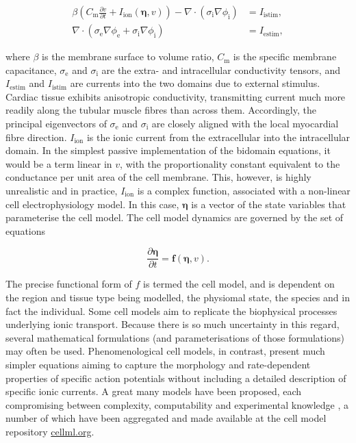   \begin{align}
    \beta \left( C_\text{m}\frac{\partial v}{\partial t} + I_\text{ion}\left( \boldsymbol\eta, v \right) \right) - \nabla \cdot \left( \sigma_\text{i} \nabla \phi_\text{i} \right) &= I_\text{istim}, \\
      \nabla \cdot \left( \sigma_\text{e} \nabla \phi_\text{e} +  \sigma_\text{i} \nabla \phi_\text{i} \right) &= I_\text{estim},
  \end{align} 
  
  where $\beta$ is the membrane surface to volume ratio, $C_\text{m}$ is the specific membrane capacitance, $\sigma_\text{e}$ and $\sigma_\text{i}$ are the extra- and intracellular conductivity tensors, and $I_\text{estim}$ and $I_\text{istim}$ are currents into the two domains due to external stimulus. Cardiac tissue exhibits anisotropic conductivity, transmitting current much more readily along the tubular muscle fibres than across them. Accordingly, the principal eigenvectors of $\sigma_\text{e}$ and $\sigma_\text{i}$ are closely aligned with the local myocardial fibre direction. $I_\text{ion}$ is the ionic current from the extracellular into the intracellular domain. In the simplest passive implementation of the bidomain equations, it would be a term linear in $v$, with the proportionality constant equivalent to the conductance per unit area of the cell membrane. This, however, is highly unrealistic and in practice, $I_\text{ion}$ is a complex function, associated with a non-linear cell electrophysiology model. In this case, $\boldsymbol\eta$ is a vector of the state variables that parameterise the cell model. The cell model dynamics are governed by the set of equations
  
  \begin{equation}
    \frac{\partial \boldsymbol\eta}{\partial t} = \mathbf{f}\left(\boldsymbol\eta, v \right).
  \end{equation}
  
  The precise functional form of $f$ is termed the cell model, and is dependent on the region and tissue type being modelled, the physiomal state, the species and in fact the individual. Some cell models aim to replicate the biophysical processes underlying ionic transport. Because there is so much uncertainty in this regard, several mathematical formulations (and parameterisations of those formulations) may often be used. Phenomenological cell models, in contrast, present much simpler equations aiming to capture the morphology and rate-dependent properties of specific action potentials without including a detailed description of specific ionic currents. A great many models have been proposed, each compromising between complexity, computability and experimental knowledge \cite{Noble2011,Carusi2012}, a number of which have been aggregated and made available at the cell model repository \url{cellml.org}.
  

